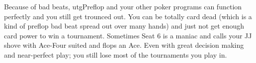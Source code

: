 
Because of bad beats, utgPreflop and your other poker programs can
function perfectly and you still get trounced out. You can be totally
card dead (which is a kind of preflop bad beat spread out over many
hands) and just not get enough card power to win a
tournament. Sometimes Seat 6 is a maniac and calls your JJ shove with
Ace-Four suited and flops an Ace. Even with great decision making and
near-perfect play; you still lose most of the tournaments you play
in.


